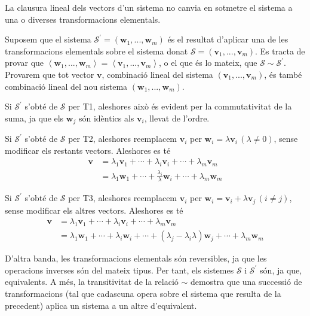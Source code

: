 \begin{teorema}
La clausura lineal dels vectors d’un sistema no canvia en sotmetre el
sistema a una o diverses transformacions elementals.

\end{teorema}
\begin{prova}
Suposem que el sistema $\mathcal{S}^{\prime }=\left( \mathbf{w}_{1},...,%
\mathbf{w}_{m}\right) $ és el resultat d'aplicar una de les
transformacions elementals sobre el sistema donat $\mathcal{S}=\left( 
\mathbf{v}_{1},...,\mathbf{v}_{m}\right) $. Es tracta de provar que $%
\left\langle \mathbf{w}_{1},...,\mathbf{w}_{m}\right\rangle =\left\langle 
\mathbf{v}_{1},...,\mathbf{v}_{m}\right\rangle $, o el que és lo mateix, que $%
\mathcal{S}\sim \mathcal{S}^{\prime }$. Provarem que tot vector $\mathbf{v%
}$, combinació lineal del sistema $\left( \mathbf{v}_{1},...,\mathbf{v}%
_{m}\right) $, és també combinació lineal del nou sistema $%
\left( \mathbf{w}_{1},...,\mathbf{w}_{m}\right) $.

Si $\mathcal{S}^{\prime }$ s’obté de $\mathcal{S}$ per T1, aleshores això
és evident per la commutativitat de la suma, ja que els $\mathbf{w}_{j}$ són
idèntics als $\mathbf{v}_{i}$, llevat de l'ordre.

Si $\mathcal{S}^{\prime }$ s’obté de $\mathcal{S}$ per T2, aleshores
reemplacem $\mathbf{v}_{i}$ per $\mathbf{w}_{i}=\lambda \mathbf{v}%
_{i}\,(\lambda \neq 0)$, sense modificar els restants vectors. Aleshores es
té%
\begin{align*}
\mathbf{v} &=\lambda _{1}\mathbf{v}_{1}+\cdots +\lambda _{i}\mathbf{v}%
_{i}+\cdots +\lambda _{m}\mathbf{v}_{m} \\
&=\lambda _{1}\mathbf{w}_{1}+\cdots +\frac{\lambda _{i}}{\lambda }\mathbf{w}%
_{i}+\cdots +\lambda _{m}\mathbf{w}_{m}
\end{align*}

Si $\mathcal{S}^{\prime }$ s’obté de $\mathcal{S}$ per T3, aleshores
reemplacem $\mathbf{v}_{i}$ per $\mathbf{w}_{i}=\mathbf{v}_{i}+\lambda 
\mathbf{v}_{j}\,(i\neq j)$, sense modificar els altres vectors. Aleshores es
té%
\begin{align*}
\mathbf{v} &=\lambda _{1}\mathbf{v}_{1}+\cdots +\lambda _{i}\mathbf{v}%
_{i}+\cdots +\lambda _{m}\mathbf{v}_{m} \\
&=\lambda _{1}\mathbf{w}_{1}+\cdots +\lambda _{i}\mathbf{w}_{i}+\cdots
+(\lambda _{j}-\lambda _{i}\lambda )\mathbf{w}_{j}+\cdots +\lambda _{m}%
\mathbf{w}_{m}
\end{align*}

D’altra banda, les transformacions elementals són reversibles, ja que les
operacions inverses són del mateix tipus. Per tant, els sistemes $\mathcal{S}
$ i $\mathcal{S}^{\prime }$ són, ja que, equivalents. A més, la
transitivitat de la relació $\sim $ demostra que una successió de
transformacions (tal que cadascuna opera sobre el sistema que resulta de la
precedent) aplica un sistema a un altre d’equivalent.
\end{prova}

